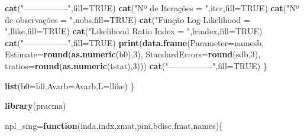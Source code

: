 \documentclass[12pt,a4paper]{article}
\newenvironment{Shaded}{\begin{snugshade}}{\end{snugshade}}
\newcommand{\ControlFlowTok}[1]{\textcolor[rgb]{0.13,0.29,0.53}{\textbf{#1}}}
\newcommand{\DataTypeTok}[1]{\textcolor[rgb]{0.13,0.29,0.53}{#1}}
\newcommand{\DecValTok}[1]{\textcolor[rgb]{0.00,0.00,0.81}{#1}}
\newcommand{\KeywordTok}[1]{\textcolor[rgb]{0.13,0.29,0.53}{\textbf{#1}}}
\newcommand{\NormalTok}[1]{#1}
\newcommand{\OtherTok}[1]{\textcolor[rgb]{0.56,0.35,0.01}{#1}}
\newcommand{\StringTok}[1]{\textcolor[rgb]{0.31,0.60,0.02}{#1}}
\begin{document}
\begin{Shaded}
\begin{Highlighting}[]
{{{{{{{{{    \KeywordTok{cat}\NormalTok{(}\StringTok{"----------------"}\NormalTok{,}\DataTypeTok{fill=}\OtherTok{TRUE}\NormalTok{)}
    \KeywordTok{cat}\NormalTok{(}\StringTok{"Nº de Iterações     = "}\NormalTok{,iter,}\DataTypeTok{fill=}\OtherTok{TRUE}\NormalTok{)}
    \KeywordTok{cat}\NormalTok{(}\StringTok{"Nº de observações   = "}\NormalTok{,nobs,}\DataTypeTok{fill=}\OtherTok{TRUE}\NormalTok{)}
    \KeywordTok{cat}\NormalTok{(}\StringTok{"Função Log-Likelihood  = "}\NormalTok{,llike,}\DataTypeTok{fill=}\OtherTok{TRUE}\NormalTok{)}
    \KeywordTok{cat}\NormalTok{(}\StringTok{"Likelihood Ratio Index   = "}\NormalTok{,lrindex,}\DataTypeTok{fill=}\OtherTok{TRUE}\NormalTok{)}
    \KeywordTok{cat}\NormalTok{(}\StringTok{"----------------"}\NormalTok{,}\DataTypeTok{fill=}\OtherTok{TRUE}\NormalTok{)}
    \KeywordTok{print}\NormalTok{(}\KeywordTok{data.frame}\NormalTok{(}\DataTypeTok{Parameter=}\NormalTok{namesb,}
                     \DataTypeTok{Estimate=}\KeywordTok{round}\NormalTok{(}\KeywordTok{as.numeric}\NormalTok{(b0),}\DecValTok{3}\NormalTok{),}
                     \DataTypeTok{StandardErrors=}\KeywordTok{round}\NormalTok{(sdb,}\DecValTok{3}\NormalTok{),}
                     \DataTypeTok{tratios=}\KeywordTok{round}\NormalTok{(}\KeywordTok{as.numeric}\NormalTok{(tstat),}\DecValTok{3}\NormalTok{)))}
    \KeywordTok{cat}\NormalTok{(}\StringTok{"----------------"}\NormalTok{,}\DataTypeTok{fill=}\OtherTok{TRUE}\NormalTok{)}
\NormalTok{  \}}
  
  \KeywordTok{list}\NormalTok{(}\DataTypeTok{b0=}\NormalTok{b0,}\DataTypeTok{Avarb=}\NormalTok{Avarb,}\DataTypeTok{L=}\NormalTok{llike)}
\NormalTok{\}}


\KeywordTok{library}\NormalTok{(pracma)}

\NormalTok{npl_sing=}\ControlFlowTok{function}\NormalTok{(inda,indx,zmat,pini,bdisc,fmat,names)\{}
  
}}}}}}}}}
\end{Highlighting}
\end{Shaded}
\end{document}
